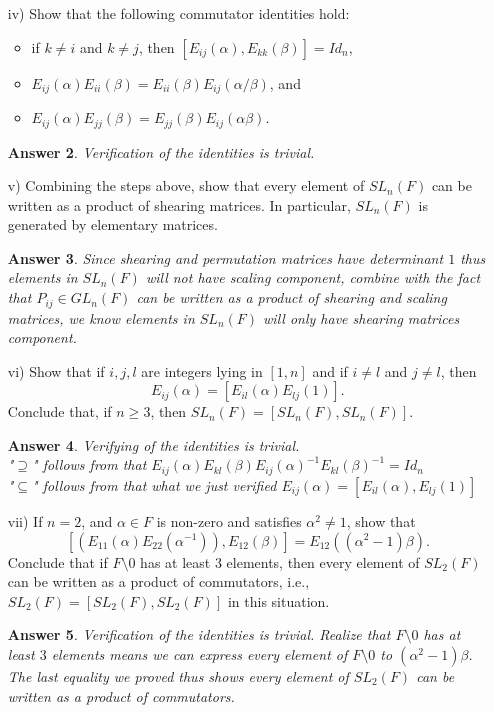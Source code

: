 \documentclass[11pt,leqno]{article}
\newcommand{\<}[1]{{\langle}#1 {\rangle}}
\theoremstyle{plain}
\newtheorem*{answer*}{Answer}
\theoremstyle{definition}
\theoremstyle{remark}
\numberwithin{equation}{section}
\begin{document}
\begin{enumerate}
\begin{itemize}
\begin{answer*}
        \end{answer*}
    \item[iv)] Show that the following commutator identities hold:
    \begin{itemize}
    \item if $k \neq i$ and $k \neq j$, then $[E_{ij}(\alpha),E_{kk}(\beta)] = Id_n$,
    \item $E_{ij}(\alpha)E_{ii}(\beta) = E_{ii}(\beta)E_{ij}(\alpha/\beta)$, and
    \item $E_{ij}(\alpha)E_{jj}(\beta) = E_{jj}(\beta)E_{ij}(\alpha\beta)$.
    \end{itemize}
        \begin{answer*}  
        Verification of the identities is trivial.
        \end{answer*}
    \item[v)] Combining the steps above, show that every element of $SL_n(F)$ can be written as a product of shearing matrices.  In particular, $SL_n(F)$ is generated by elementary matrices.
        \begin{answer*}
        Since shearing and permutation matrices have determinant $1$ thus elements in $SL_n(F)$ will not have scaling component, combine with the fact that $P_{ij} \in GL_n(F)$ can be written as a product of shearing and scaling matrices, we know elements in $SL_n(F)$ will only have shearing matrices component.     
        \end{answer*}
    \item[vi)] Show that if $i,j,l$ are integers lying in $[1,n]$ and if $i \neq l$ and $j \neq l$, then
        \[
        E_{ij}(\alpha) = [E_{il}(\alpha)E_{lj}(1)].
        \]
        Conclude that, if $n \geq 3$, then $SL_n(F) = [SL_n(F),SL_n(F)]$.
        \begin{answer*}
        Verifying of the identities is trivial. \\ "$\supseteq$" follows from that
        $E_{ij}(\alpha)E_{kl}(\beta)E_{ij}(\alpha)^{-1}E_{kl}(\beta)^{-1} =Id_n$ \\
        "$\subseteq$" follows from that what we just verified $E_{ij}(\alpha) = [E_{il}(\alpha),E_{lj}(1)]$
        \end{answer*}
    \item[vii)] If $n = 2$, and $\alpha \in F$ is non-zero and satisfies $\alpha^2 \neq 1$, show that
        \[
        [(E_{11}(\alpha)E_{22}(\alpha^{-1})),E_{12}(\beta)] = E_{12}((\alpha^2 - 1)\beta).
        \]
        Conclude that if $F \setminus 0$ has at least $3$ elements, then every element of $SL_2(F)$ can be written as a product of commutators, i.e., $SL_2(F) = [SL_2(F),SL_2(F)]$ in this situation.
        \begin{answer*}
        Verification of the identities is trivial. Realize that $F \setminus 0$ has at least $3$ elements means we can express every element of $F \setminus 0$ to $(\alpha^2 - 1)\beta$. The last equality we proved thus shows every element of $SL_2(F)$ can be written as a product of commutators.
        \end{answer*}
    \end{itemize}
    

\end{enumerate}
\end{document}
